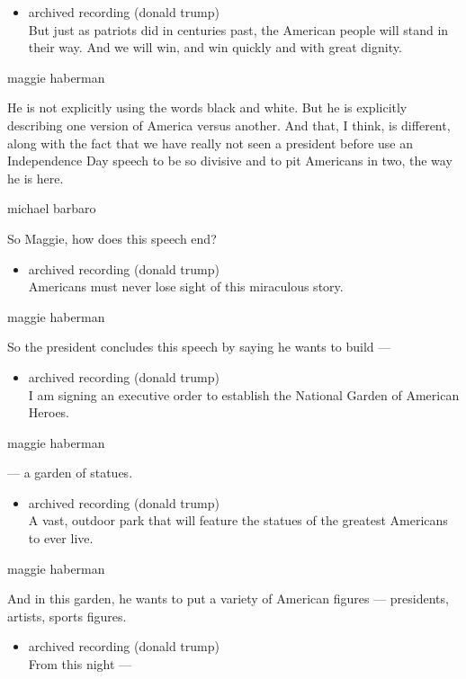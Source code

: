 \begin{itemize}
\tightlist
\item
  archived recording (donald trump)\\
  But just as patriots did in centuries past, the American people will
  stand in their way. And we will win, and win quickly and with great
  dignity.
\end{itemize}

maggie haberman

He is not explicitly using the words black and white. But he is
explicitly describing one version of America versus another. And that, I
think, is different, along with the fact that we have really not seen a
president before use an Independence Day speech to be so divisive and to
pit Americans in two, the way he is here.

michael barbaro

So Maggie, how does this speech end?

\begin{itemize}
\tightlist
\item
  archived recording (donald trump)\\
  Americans must never lose sight of this miraculous story.
\end{itemize}

maggie haberman

So the president concludes this speech by saying he wants to build ---

\begin{itemize}
\tightlist
\item
  archived recording (donald trump)\\
  I am signing an executive order to establish the National Garden of
  American Heroes.
\end{itemize}

maggie haberman

--- a garden of statues.

\begin{itemize}
\tightlist
\item
  archived recording (donald trump)\\
  A vast, outdoor park that will feature the statues of the greatest
  Americans to ever live.
\end{itemize}

maggie haberman

And in this garden, he wants to put a variety of American figures ---
presidents, artists, sports figures.

\begin{itemize}
\tightlist
\item
  archived recording (donald trump)\\
  From this night ---
\end{itemize}

